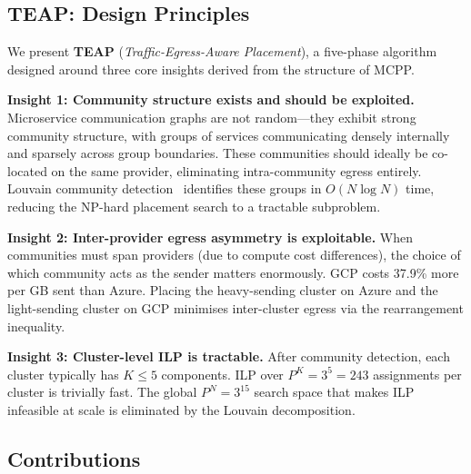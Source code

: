 \documentclass[sigconf,10pt]{acmart}
\begin{document}
\subsection{TEAP: Design Principles}

We present \textbf{TEAP} (\emph{Traffic-Egress-Aware Placement}), a five-phase
algorithm designed around three core insights derived from the structure of MCPP.

\textbf{Insight 1: Community structure exists and should be exploited.}
Microservice communication graphs are not random---they exhibit strong community
structure, with groups of services communicating densely internally and sparsely
across group boundaries.
These communities should ideally be co-located on the same provider, eliminating
intra-community egress entirely.
Louvain community detection~\cite{blondel2008} identifies these groups in
$O(N \log N)$ time, reducing the NP-hard placement search to a tractable subproblem.

\textbf{Insight 2: Inter-provider egress asymmetry is exploitable.}
When communities must span providers (due to compute cost differences), the choice of
which community acts as the sender matters enormously.
GCP costs 37.9\% more per GB sent than Azure.
Placing the heavy-sending cluster on Azure and the light-sending cluster on GCP
minimises inter-cluster egress via the rearrangement inequality.

\textbf{Insight 3: Cluster-level ILP is tractable.}
After community detection, each cluster typically has $K \leq 5$ components.
ILP over $P^K = 3^5 = 243$ assignments per cluster is trivially fast.
The global $P^N = 3^{15}$ search space that makes ILP infeasible at scale is
eliminated by the Louvain decomposition.

\subsection{Contributions}
\end{document}

